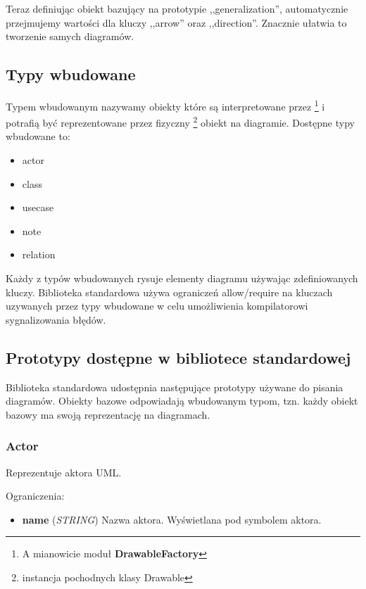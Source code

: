 Teraz definiując obiekt bazujący na prototypie ,,generalization'', automatycznie przejmujemy wartości dla kluczy ,,arrow'' oraz ,,direction''. Znacznie ułatwia to tworzenie samych diagramów.

\subsection{Typy wbudowane}

Typem wbudowanym nazywamy obiekty które są interpretowane przez \omlet \footnote{A mianowicie moduł \textbf{DrawableFactory}} i potrafią być reprezentowane przez fizyczny \footnote{instancja pochodnych klasy Drawable} obiekt na diagramie. Dostępne typy wbudowane to:

\begin{itemize}
	\item actor
	\item class
	\item usecase
	\item note
	\item relation
\end{itemize}

Każdy z typów wbudowanych rysuje elementy diagramu używając zdefiniowanych kluczy. Biblioteka standardowa używa ograniczeń allow/require na kluczach uzywanych przez typy wbudowane w celu umożliwienia kompilatorowi sygnalizowania błędów.

\subsection{Prototypy dostępne w bibliotece standardowej}

Biblioteka standardowa udostępnia następujące prototypy używane do pisania diagramów. Obiekty bazowe odpowiadają wbudowanym typom, tzn. każdy obiekt bazowy ma swoją reprezentację na diagramach.

\subsubsection{Actor}
Reprezentuje aktora UML.

Ograniczenia:
\begin{itemize}
	\item \textbf{name} (\emph{STRING}) Nazwa aktora. Wyświetlana pod symbolem aktora.
\end{itemize}
	
